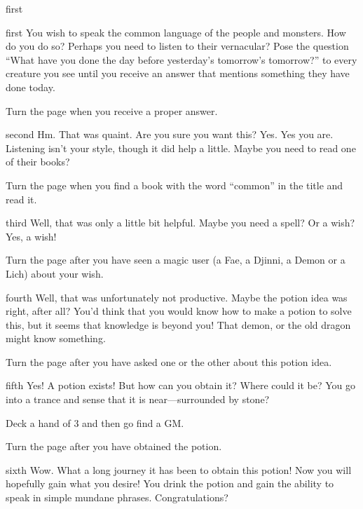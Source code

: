 \documentclass[notebook]{guildcamp2} %
\begin{document}
\startnotebook{\nspeaknormal{}}

\begin{page}{first}
\end{page}

\begin{page}{first}
You wish to speak the common language of the people and monsters. How do you do so? Perhaps you need to listen to their vernacular? Pose the question ``What have you done the day before yesterday's tomorrow's tomorrow?'' to every creature you see until you receive an answer that mentions something they have done today.

Turn the page when you receive a proper answer.
\end{page}

\begin{page}{second}
Hm. That was quaint. Are you sure you want this? Yes. Yes you are. Listening isn't your style, though it did help a little. Maybe you need to read one of their books?

Turn the page when you find a book with the word ``common'' in the title and read it.
\end{page}

\begin{page}{third}
Well, that was only a little bit helpful. Maybe you need a spell? Or a wish? Yes, a wish!

Turn the page after you have seen a magic user (a Fae, a Djinni, a Demon or a Lich) about your wish. 
\end{page}

\begin{page}{fourth}
Well, that was unfortunately not productive. Maybe the potion idea was right, after all? You'd think that you would know how to make a potion to solve this, but it seems that knowledge is beyond you! That demon, \cDemon{} or the old dragon \cOnyx{} might know something.

Turn the page after you have asked one or the other about this potion idea.
\end{page}

\begin{page}{fifth}
Yes! A potion exists! But how can you obtain it? Where could it be? You go into a trance and sense that it is near---surrounded by stone?

Deck a hand of 3 and then go find a GM.

Turn the page after you have obtained the potion.
\end{page}

\begin{page}{sixth}
Wow. What a long journey it has been to obtain this potion! Now you will hopefully gain what you desire! You drink the potion and gain the ability to speak in simple mundane phrases. Congratulations?
\end{page}

\endnotebook
\end{document}
